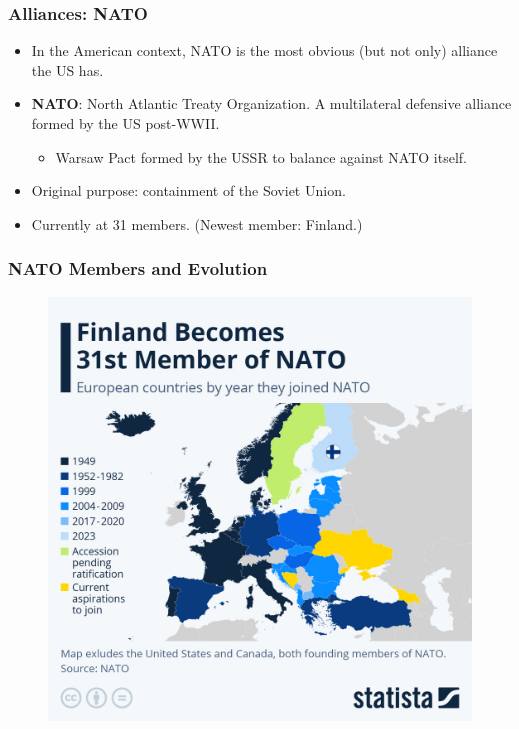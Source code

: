 \documentclass[handout]{beamer}
\begin{document}
\begin{frame} 
	\frametitle{\LARGE{Alliances: NATO}}
	\begin{itemize}
		\item In the American context, NATO is the most obvious (but not only) alliance the US has. \pause
		\item \textbf{NATO}: North Atlantic Treaty Organization. A multilateral defensive alliance formed by the US post-WWII. \pause
		\begin{itemize}
			\item Warsaw Pact formed by the USSR to balance against NATO itself. \pause
		\end{itemize}
		\item Original purpose: containment of the Soviet Union. \pause
		\item Currently at 31 members. (Newest member: Finland.)
	\end{itemize}
\end{frame}

\begin{frame} 
	\frametitle{\LARGE{NATO Members and Evolution}}
	\begin{figure}[ht!]
		\centering
		\includegraphics[width=\textwidth,height=\textheight, keepaspectratio]{NATO2023.jpeg}
	\end{figure}
\end{frame}
\end{document}
